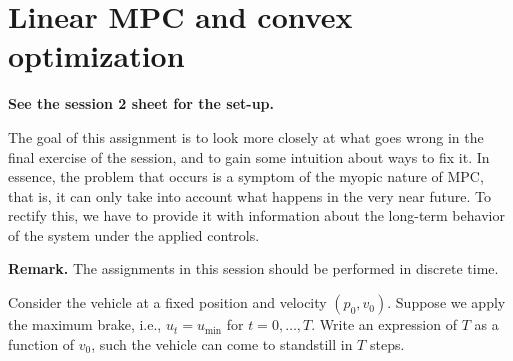 \documentclass[]{article}
\begin{document}
\newpage
\section{Linear MPC and convex optimization}
\textbf{See the session 2 sheet for the set-up.}

The goal of this assignment is to look more closely at what goes wrong in the 
final exercise of the session, and to gain some intuition about ways to fix it.
In essence, the problem that occurs is a symptom of the myopic nature of MPC,
that is, it can only take into account what happens in the very near future.
To rectify this, we have to provide it with information about the long-term
behavior of the system under the applied controls.

\textbf{Remark.} The assignments in this session should be performed in discrete time.

\begin{assignment}
	Consider the vehicle at a fixed position and velocity $(p_0, v_0)$.
	Suppose we apply the maximum brake, i.e., $u_t = u_{\min}$ for $t = 0, \dots, T$.
	Write an expression of $T$ as a function of $v_0$, such the vehicle can come to standstill in $T$ steps.
\end{assignment}
\end{document}

